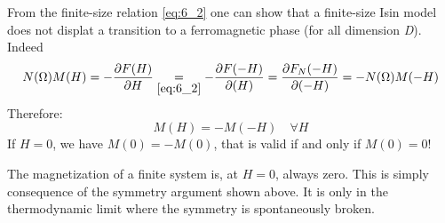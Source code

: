 \documentclass[../main/main.tex]{subfiles}
\begin{document}
\begin{remark}
From the finite-size relation \eqref{eq:6_2} one can show that a finite-size Isin model does not displat a transition to a ferromagnetic phase (for all dimension \emph{D}). Indeed
\begin{equation}
    N (\Omega ) M(H) = - \pdv{F (H)}{H} \underset{\eqref{eq:6_2}}{=}  - \pdv{F(-H)}{(H)} = \pdv{F_N(-H)}{(-H)}  = - N (\Omega ) M (-H)
\end{equation}
Therefore:
\begin{equation}
  M (H) = - M (-H) \quad \forall H
\end{equation}
If \( H=0 \), we have \( M (0) = -M (0) \), that is valid if and only if \( M(0)= 0 \)!

The magnetization of a finite system is, at \( H=0 \), always zero. This is simply consequence of the symmetry argument shown above. It is only in the thermodynamic limit where the symmetry is spontaneously broken.
\end{remark}
\end{document}
